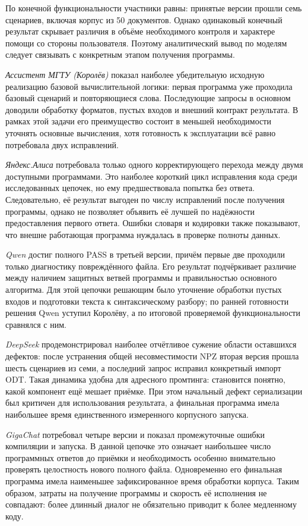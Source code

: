 По конечной функциональности участники равны: принятые версии прошли семь сценариев, включая корпус из 50 документов. Однако одинаковый конечный результат скрывает различия в объёме необходимого контроля и характере помощи со стороны пользователя. Поэтому аналитический вывод по моделям следует связывать с конкретным этапом получения программы.

\emph{Ассистент МГТУ (Королёв)} показал наиболее убедительную исходную реализацию базовой вычислительной логики: первая программа уже проходила базовый сценарий и повторяющиеся слова. Последующие запросы в основном доводили обработку форматов, пустых входов и внешний контракт результата. В рамках этой задачи его преимущество состоит в меньшей необходимости уточнять основные вычисления, хотя готовность к эксплуатации всё равно потребовала двух исправлений.

\emph{Яндекс.Алиса} потребовала только одного корректирующего перехода между двумя доступными программами. Это наиболее короткий цикл исправления кода среди исследованных цепочек, но ему предшествовала попытка без ответа. Следовательно, её результат выгоден по числу исправлений после получения программы, однако не позволяет объявить её лучшей по надёжности предоставления первого ответа. Ошибки словаря и кодировки также показывают, что внешне работающая программа нуждалась в проверке полноты данных.

\emph{Qwen} достиг полного PASS в третьей версии, причём первые две проходили только диагностику повреждённого файла. Его результат подчёркивает различие между наличием защитных ветвей программы и правильностью основного алгоритма. Для этой цепочки решающим было уточнение обработки пустых входов и подготовки текста к синтаксическому разбору; по ранней готовности решения Qwen уступил Королёву, а по итоговой проверяемой функциональности сравнялся с ним.

\emph{DeepSeek} продемонстрировал наиболее отчётливое сужение области оставшихся дефектов: после устранения общей несовместимости NPZ вторая версия прошла шесть сценариев из семи, а последний запрос исправил конкретный импорт ODT. Такая динамика удобна для адресного промтинга: становится понятно, какой компонент ещё мешает приёмке. При этом начальный дефект сериализации был критичен для использования результата, а финальная программа имела наибольшее время единственного измеренного корпусного запуска.

\emph{GigaChat} потребовал четыре версии и показал промежуточные ошибки компиляции и запуска. В данной цепочке это означает наибольшее число программных ответов до приёмки и необходимость особенно внимательно проверять целостность нового полного файла. Одновременно его финальная программа имела наименьшее зафиксированное время обработки корпуса. Таким образом, затраты на получение программы и скорость её исполнения не совпадают: более длинный диалог не обязательно приводит к более медленному коду.

